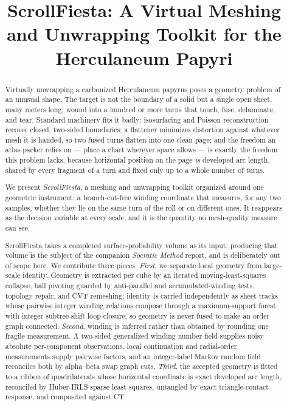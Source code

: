 \documentclass[acmtog,nonacm]{acmart}
\begin{document}
\title{ScrollFiesta: A Virtual Meshing and Unwrapping Toolkit for the Herculaneum Papyri}

\renewcommand{\shortauthors}{ScrollFiesta}

\begin{abstract}
Virtually unwrapping a carbonized Herculaneum papyrus poses a geometry problem of an unusual shape. The target is not the boundary of a solid but a single open sheet, many meters long, wound into a hundred or more turns that touch, fuse, delaminate, and tear. Standard machinery fits it badly: isosurfacing and Poisson reconstruction recover closed, two-sided boundaries; a flattener minimizes distortion against whatever mesh it is handed, so two fused turns flatten into one clean page; and the freedom an atlas packer relies on --- place a chart wherever space allows --- is exactly the freedom this problem lacks, because horizontal position on the page \emph{is} developed arc length, shared by every fragment of a turn and fixed only up to a whole number of turns.

We present \emph{ScrollFiesta}, a meshing and unwrapping toolkit organized around one geometric instrument: a branch-cut-free winding coordinate that measures, for any two samples, whether they lie on the same turn of the roll or on different ones. It reappears as the decision variable at every scale, and it is the quantity no mesh-quality measure can see.

ScrollFiesta takes a completed surface-probability volume as its input; producing that volume is the subject of the companion \emph{Socratic Method} report, and is deliberately out of scope here. We contribute three pieces. \emph{First}, we separate local geometry from large-scale identity. Geometry is extracted per cube by an iterated moving-least-squares collapse, ball pivoting guarded by anti-parallel and accumulated-winding tests, topology repair, and CVT remeshing; identity is carried independently as sheet tracks whose pairwise integer winding relations compose through a maximum-support forest with integer subtree-shift loop closure, so geometry is never fused to make an order graph connected. \emph{Second}, winding is inferred rather than obtained by rounding one fragile measurement. A two-sided generalized winding number field supplies noisy absolute per-component observations, local continuation and radial-order measurements supply pairwise factors, and an integer-label Markov random field reconciles both by alpha--beta swap graph cuts. \emph{Third}, the accepted geometry is fitted to a ribbon of quadrilaterals whose horizontal coordinate is exact developed arc length, reconciled by Huber-IRLS sparse least squares, untangled by exact triangle-contact response, and composited against CT.


\end{abstract}
\end{document}
